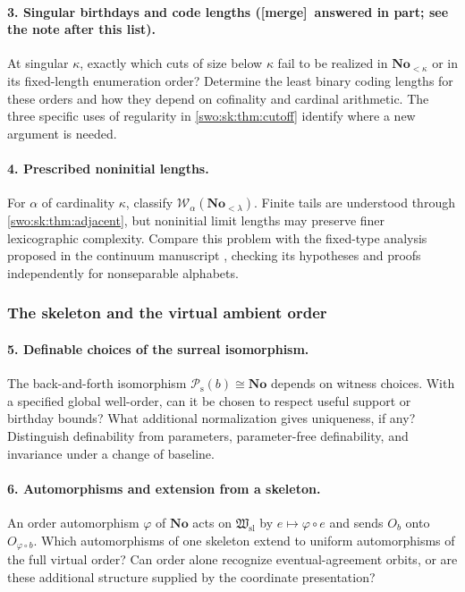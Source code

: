 \documentclass[11pt]{article}
\theoremstyle{definition}
\theoremstyle{remark}
\newcommand{\No}{\mathbf{No}}
\newcommand{\W}{\mathcal W}
\newcommand{\Hsl}{\mathfrak W_{\mathrm{sl}}}
\newcommand{\Psupp}{\mathcal P_{\mathrm{s}}}
\newcommand{\merge}{\textsf{[merge]}}
\begin{document}
\paragraph{3. Singular birthdays and code lengths (\merge\ answered in part; see the note after this list).}
At singular $\kappa$, exactly which cuts of size below $\kappa$ fail to
be realized in $\No_{<\kappa}$ or in its fixed-length enumeration
order? Determine the least binary coding lengths for these orders and
how they depend on cofinality and cardinal arithmetic. The three
specific uses of regularity in \cref{swo:sk:thm:cutoff} identify where a new
argument is needed.

\paragraph{4. Prescribed noninitial lengths.}
For $\alpha$ of cardinality $\kappa$, classify
$\W_\alpha(\No_{<\lambda})$. Finite tails are understood through
\cref{swo:sk:thm:adjacent}, but noninitial limit lengths may preserve finer
lexicographic complexity. Compare this problem with the fixed-type
analysis proposed in the continuum manuscript \cite{Batch76Source02}, checking
its hypotheses and proofs independently for nonseparable alphabets.

\subsubsection{The skeleton and the virtual ambient order}

\paragraph{5. Definable choices of the surreal isomorphism.}
The back-and-forth isomorphism $\Psupp(b)\cong\No$ depends on witness
choices. With a specified global well-order, can it be chosen to
respect useful support or birthday bounds? What additional
normalization gives uniqueness, if any? Distinguish definability from
parameters, parameter-free definability, and invariance under a change
of baseline.

\paragraph{6. Automorphisms and extension from a skeleton.}
An order automorphism $\varphi$ of $\No$ acts on $\Hsl$ by
$e\mapsto\varphi\circ e$ and sends $O_b$ onto $O_{\varphi\circ b}$.
Which automorphisms of one skeleton extend to uniform automorphisms of
the full virtual order? Can order alone recognize eventual-agreement
orbits, or are these additional structure supplied by the coordinate
presentation?
\end{document}

